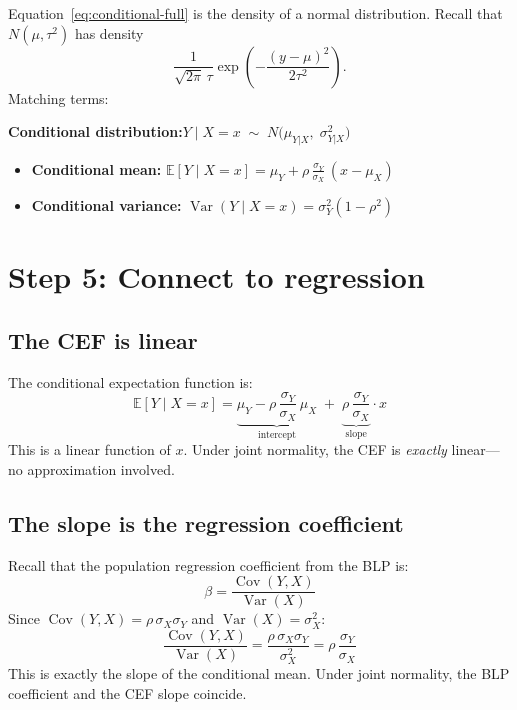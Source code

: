 \documentclass[11pt]{article}
\newcommand{\Var}{\operatorname{Var}}
\newcommand{\Cov}{\operatorname{Cov}}
\begin{document}
Equation~\eqref{eq:conditional-full} is the density of a normal distribution.  Recall that $N(\mu, \tau^2)$ has density
\[
\frac{1}{\sqrt{2\pi}\,\tau}\exp\!\left(-\frac{(y-\mu)^2}{2\tau^2}\right).
\]
Matching terms:

\begin{tcolorbox}[colback=blue!5, colframe=blue!50]
\textbf{Conditional distribution:}\quad $Y\mid X=x \;\sim\; N\!\Big(\mu_{Y|X},\;\sigma^2_{Y|X}\Big)$

\medskip
\begin{itemize}[leftmargin=2em]
\item \textbf{Conditional mean:}\quad
$\displaystyle\mathbb{E}[Y\mid X=x] = \mu_Y + \rho\,\frac{\sigma_Y}{\sigma_X}\,(x - \mu_X)$

\medskip
\item \textbf{Conditional variance:}\quad
$\displaystyle\Var(Y\mid X=x) = \sigma_Y^2(1 - \rho^2)$
\end{itemize}
\end{tcolorbox}

\section{Step 5: Connect to regression}

\subsection{The CEF is linear}

The conditional expectation function is:
\[
\mathbb{E}[Y \mid X = x]
= \underbrace{\mu_Y - \rho\,\frac{\sigma_Y}{\sigma_X}\,\mu_X}_{\text{intercept}} \;+\; \underbrace{\rho\,\frac{\sigma_Y}{\sigma_X}}_{\text{slope}}\cdot x
\]
This is a linear function of $x$.  Under joint normality, the CEF is \emph{exactly} linear---no approximation involved.

\subsection{The slope is the regression coefficient}

Recall that the population regression coefficient from the BLP is:
\[
\beta = \frac{\Cov(Y,X)}{\Var(X)}
\]
Since $\Cov(Y,X) = \rho\,\sigma_X\sigma_Y$ and $\Var(X) = \sigma_X^2$:
\[
\frac{\Cov(Y,X)}{\Var(X)} = \frac{\rho\,\sigma_X\sigma_Y}{\sigma_X^2} = \rho\,\frac{\sigma_Y}{\sigma_X}
\]
This is exactly the slope of the conditional mean.  Under joint normality, the BLP coefficient and the CEF slope coincide.
\end{document}
